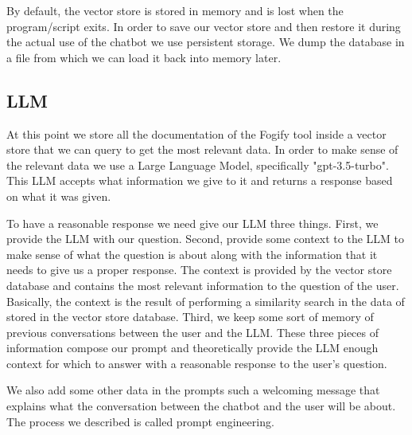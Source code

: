 By default, the vector store is stored in memory and is lost when the
program/script exits. In order to save our vector store and then restore it
during the actual use of the chatbot we use persistent storage. We dump the
database in a file
from which we can load it back into memory later.

\subsection[short]{LLM}
At this point we store all the documentation of the Fogify tool inside a vector
store
that we can query to get the most relevant data. In order to make sense of the
relevant data we use a Large Language Model, specifically "gpt-3.5-turbo". This
LLM accepts what
information we give to it and returns a response based on what it was given.

To have a reasonable response we need give our LLM three things.
First, we provide the LLM with our question. Second, provide some
context to the LLM to make sense of what the question is about along with
the information that it needs to give us a proper response. The context is
provided by the vector store database and contains the most relevant
information to the question of the user. Basically, the context is the result
of performing
a similarity search in the data of stored in the vector store database. Third,
we
keep some sort of memory of previous conversations between the user and the
LLM. These
three pieces of information compose our prompt and theoretically provide the
LLM
enough context for which to answer with a reasonable response to the user's
question.

We also add some other data in the prompts such a welcoming message that
explains what the conversation between the chatbot and the user will be about.
The process we described is called prompt engineering.